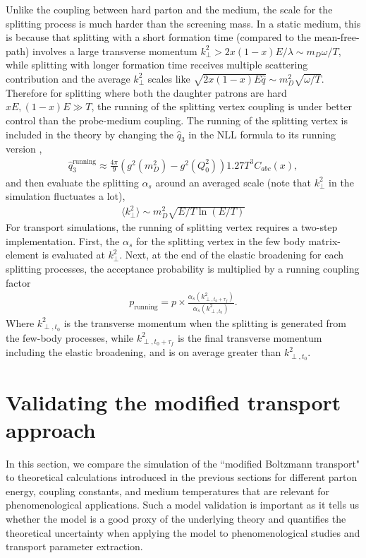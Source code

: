 Unlike the coupling between hard parton and the medium, the scale for the splitting process is much harder than the screening mass.
In a static medium, this is because that splitting with a short formation time (compared to the mean-free-path) involves a large transverse momentum $k_\perp^2 > 2x(1-x)E /\lambda \sim m_D \omega/T$, while splitting with longer formation time receives multiple scattering contribution and the average $k_\perp^2$ scales like $\sqrt{2x(1-x)E\hat{q}} \sim m_D^2 \sqrt{\omega/T}$.
Therefore for splitting where both the daughter patrons are hard $xE, (1-x)E \gg T$, the running of the splitting vertex coupling is under better control than the probe-medium coupling.
The running of the splitting vertex is included in the theory by changing the $\hat{q}_3$ in the NLL formula to its running version  \cite{Arnold:2008zu},
\begin{eqnarray}
\hat{q}_3^{\textrm{running}} \approx \frac{4\pi}{9}\left(g^2(m_D^2) - g^2(Q_0^2)\right) 1.27 T^3 C_{abc}(x),
\label{eq:q3running}
\end{eqnarray}
and then evaluate the splitting $\alpha_s$ around an averaged scale (note that $k_\perp^2$ in the simulation fluctuates a lot),
\begin{eqnarray}
\langle k_\perp^2\rangle \sim m_D^2 \sqrt{E/T\ln(E/T)}
\label{eq:runscale}
\end{eqnarray}  
For transport simulations, the running of splitting vertex requires a two-step implementation. 
First, the $\alpha_s$ for the splitting vertex in the few body matrix-element is evaluated at $k_\perp^2$.
Next, at the end of the elastic broadening for each splitting processes, the acceptance probability is multiplied by a running coupling factor
\begin{eqnarray}
p_{\textrm{running}} = p\times \frac{\alpha_s(k_{\perp,t_0+\tau_f}^2)}{\alpha_s(k_{\perp,t_0}^2)}.
\end{eqnarray}
Where $k_{\perp,t_0}^2$ is the transverse momentum when the splitting is generated from the few-body processes, while $k_{\perp,t_0+\tau_f}^2$ is the final transverse momentum including the elastic broadening, and is on average greater than $k_{\perp,t_0}^2$.

\section{Validating the modified transport approach}
\label{section:valiate_lido}
In this section, we compare the simulation of the ``modified Boltzmann transport" to theoretical calculations introduced in the previous sections for different parton energy, coupling constants, and medium temperatures that are relevant for phenomenological applications.
Such a model validation is important as it tells us whether the model is a good proxy of the underlying theory and quantifies the theoretical uncertainty when applying the model to phenomenological studies and transport parameter extraction.

